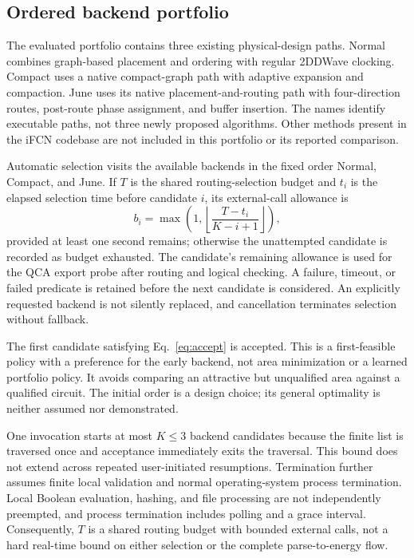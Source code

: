 \documentclass[ASNA,twocolumn]{USG}
\begin{document}
\subsection{Ordered backend portfolio}
The evaluated portfolio contains three existing physical-design paths. Normal combines graph-based placement and ordering with regular 2DDWave clocking. Compact uses a native compact-graph path with adaptive expansion and compaction. June uses its native placement-and-routing path with four-direction routes, post-route phase assignment, and buffer insertion. The names identify executable paths, not three newly proposed algorithms. Other methods present in the iFCN codebase are not included in this portfolio or its reported comparison.

Automatic selection visits the available backends in the fixed order Normal, Compact, and June. If $T$ is the shared routing-selection budget and $t_i$ is the elapsed selection time before candidate $i$, its external-call allowance is
\begin{equation}\label{eq:budget}
b_i=\max\!\left(1,\left\lfloor\frac{T-t_i}{K-i+1}\right\rfloor\right),
\end{equation}
provided at least one second remains; otherwise the unattempted candidate is recorded as budget exhausted. The candidate's remaining allowance is used for the QCA export probe after routing and logical checking. A failure, timeout, or failed predicate is retained before the next candidate is considered. An explicitly requested backend is not silently replaced, and cancellation terminates selection without fallback.

The first candidate satisfying Eq.~\eqref{eq:accept} is accepted. This is a first-feasible policy with a preference for the early backend, not area minimization or a learned portfolio policy. It avoids comparing an attractive but unqualified area against a qualified circuit. The initial order is a design choice; its general optimality is neither assumed nor demonstrated.

One invocation starts at most $K\leq3$ backend candidates because the finite list is traversed once and acceptance immediately exits the traversal. This bound does not extend across repeated user-initiated resumptions. Termination further assumes finite local validation and normal operating-system process termination. Local Boolean evaluation, hashing, and file processing are not independently preempted, and process termination includes polling and a grace interval. Consequently, $T$ is a shared routing budget with bounded external calls, not a hard real-time bound on either selection or the complete parse-to-energy flow.
\end{document}
